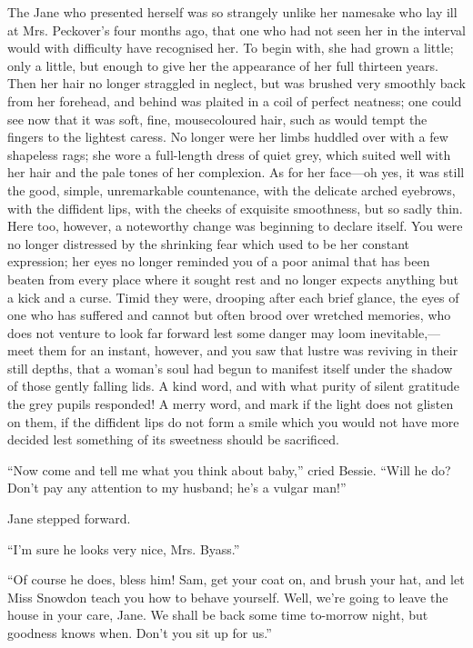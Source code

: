 The Jane who presented herself was so strangely unlike her namesake who
lay ill at Mrs. Peckover's four months ago, that one who had not seen
her in the interval would with difficulty have recognised her. To begin
with, she had grown a little; only a little, but enough to give her the
appearance of her full thirteen years. Then her hair no longer straggled
in neglect, but was brushed very smoothly back from her forehead, and
behind was plaited in a coil of perfect neatness; one could see now that
it was soft, fine, mousecoloured hair, such as would tempt the fingers
to the lightest caress. No longer were her {}limbs huddled over with a
few shapeless rags; she wore a full-length dress of quiet grey, which
suited well with her hair and the pale tones of her complexion. As for
her face---oh yes, it was still the good, simple, unremarkable
countenance, with the delicate arched eyebrows, with the diffident lips,
with the cheeks of exquisite smoothness, but so sadly thin. Here too,
however, a noteworthy change was beginning to declare itself. You were
no longer distressed by the shrinking fear which used to be her constant
expression; her eyes no longer reminded you of a poor animal that has
been beaten from every place where it sought rest and no longer expects
anything but a kick and a curse. Timid they were, drooping after each
brief glance, the eyes of one who has suffered and cannot but often
brood over wretched memories, who does not venture to look far forward
lest some danger may loom inevitable,---meet them for an instant,
however, and you saw that lustre was reviving in their still depths,
that a woman's soul had begun to manifest itself {}under the shadow of
those gently falling lids. A kind word, and with what purity of silent
gratitude the grey pupils responded! A merry word, and mark if the light
does not glisten on them, if the diffident lips do not form a smile
which you would not have more decided lest something of its sweetness
should be sacrificed.

``Now come and tell me what you think about baby,'' cried Bessie. ``Will
he do? Don't pay any attention to my husband; he's a vulgar man!''

Jane stepped forward.

``I'm sure he looks very nice, Mrs. Byass.''

``Of course he does, bless him! Sam, get your coat on, and brush your
hat, and let Miss Snowdon teach you how to behave yourself. Well, we're
going to leave the house in your care, Jane. We shall be back some time
to-morrow night, but goodness knows when. Don't you sit up for us.''

